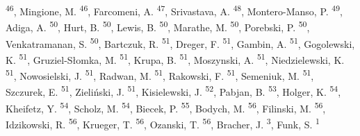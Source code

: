 \documentclass[
]{article}
\begin{document}
\textsuperscript{46}, Mingione, M. \textsuperscript{46}, Farcomeni, A. \textsuperscript{47}, Srivastava, A. \textsuperscript{48}, Montero-Manso, P. \textsuperscript{49}, Adiga, A. \textsuperscript{50}, Hurt, B. \textsuperscript{50}, Lewis, B. \textsuperscript{50}, Marathe, M. \textsuperscript{50}, Porebski, P. \textsuperscript{50}, Venkatramanan, S. \textsuperscript{50}, Bartczuk, R. \textsuperscript{51}, Dreger, F. \textsuperscript{51}, Gambin, A. \textsuperscript{51}, Gogolewski, K. \textsuperscript{51}, Gruziel-Słomka, M. \textsuperscript{51}, Krupa, B. \textsuperscript{51}, Moszynski, A. \textsuperscript{51}, Niedzielewski, K. \textsuperscript{51}, Nowosielski, J. \textsuperscript{51}, Radwan, M. \textsuperscript{51}, Rakowski, F. \textsuperscript{51}, Semeniuk, M. \textsuperscript{51}, Szczurek, E. \textsuperscript{51}, Zieliński, J. \textsuperscript{51}, Kisielewski, J. \textsuperscript{52}, Pabjan, B. \textsuperscript{53}, Holger, K. \textsuperscript{54}, Kheifetz, Y. \textsuperscript{54}, Scholz, M. \textsuperscript{54}, Biecek, P. \textsuperscript{55}, Bodych, M. \textsuperscript{56}, Filinski, M. \textsuperscript{56}, Idzikowski, R. \textsuperscript{56}, Krueger, T. \textsuperscript{56}, Ozanski, T. \textsuperscript{56}, Bracher, J. \textsuperscript{3}, Funk, S. \textsuperscript{1}
\end{document}
